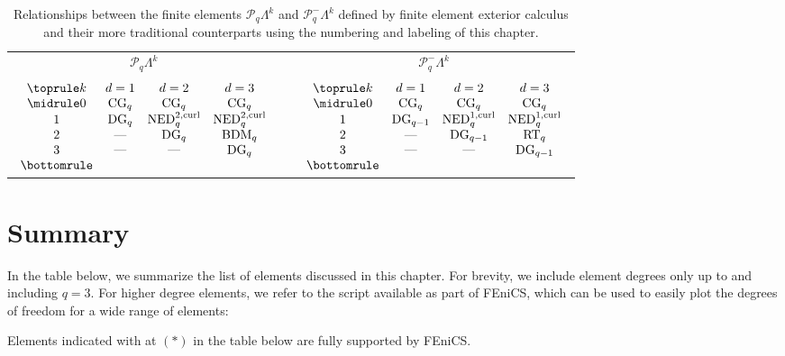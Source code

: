 \begin{table}
  \centering
  \begin{tabular}{ccc}
    $\mathcal{P}_q \Lambda^k$ & & $\mathcal{P}^-_q \Lambda^k$ \\
    \\
    $\begin{array}{cccc}
      \toprule
      k & d = 1 & d = 2 & d = 3 \\
      \midrule
      0 & \mathrm{CG}_q & \mathrm{CG}_q  & \mathrm{CG}_q \\
      1 & \mathrm{DG}_q & \mathrm{NED}^{\mathrm{2, curl}}_q & \mathrm{NED}^{\mathrm{2, curl}}_q \\
      2 & \mbox{---} & \mathrm{DG}_q & \mathrm{BDM}_q \\
      3 & \mbox{---} & \mbox{---} & \mathrm{DG}_q \\
      \bottomrule
    \end{array}$    & \quad &
    $\begin{array}{cccc}
      \toprule
      k & d = 1 & d = 2 & d = 3 \\
      \midrule
      0 & \mathrm{CG}_q & \mathrm{CG}_q  & \mathrm{CG}_q \\
      1 & \mathrm{DG}_{q-1} & \mathrm{NED}^{\mathrm{1, curl}}_q & \mathrm{NED}^{\mathrm{1, curl}}_q \\
      2 & \mbox{---}  &  \mathrm{DG}_{q-1} & \mathrm{RT}_q \\
      3 & \mbox{---}  & \mbox{---} & \mathrm{DG}_{q-1} \\
      \bottomrule
    \end{array}$
  \end{tabular}
  \caption{Relationships between the finite elements $\mathcal{P}_q
    \Lambda^k$ and $\mathcal{P}^-_q \Lambda^k$ defined by finite
    element exterior calculus and their more traditional
    counterparts using the numbering and labeling of this chapter.}
  \label{tab:feec}
\end{table}

\section{Summary}

In the table below, we summarize the list of elements discussed in
this chapter. For brevity, we include element degrees only up to and
including $q = 3$. For higher degree elements, we refer to the script
 available as part of FEniCS, which can be used to
easily plot the degrees of freedom for a wide range of elements:
Elements indicated with at $(*)$ in the table below are fully
supported by FEniCS.

